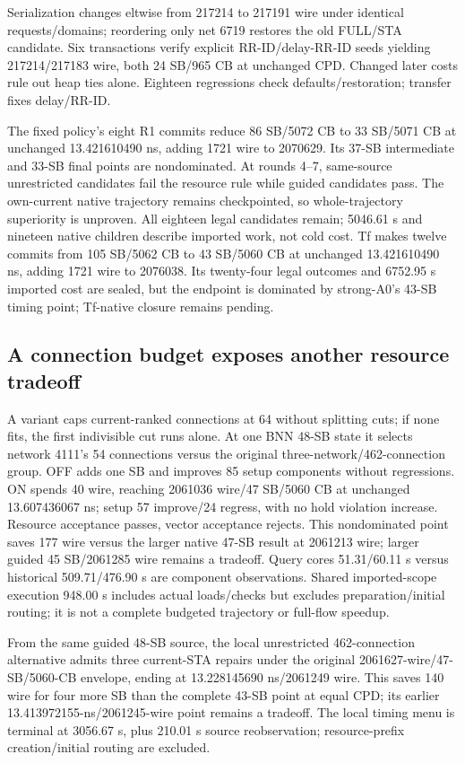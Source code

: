 \documentclass[conference,10pt]{IEEEtran}
\begin{document}
Serialization changes eltwise from 217214 to 217191 wire under identical requests/domains; reordering only net 6719 restores the old FULL/STA candidate. Six transactions verify explicit RR-ID/delay-RR-ID seeds yielding 217214/217183 wire, both 24 SB/965 CB at unchanged CPD. Changed later costs rule out heap ties alone. Eighteen regressions check defaults/restoration; transfer fixes delay/RR-ID.

The fixed policy's eight R1 commits reduce 86 SB/5072 CB to 33 SB/5071 CB at unchanged 13.421610490 ns, adding 1721 wire to 2070629. Its 37-SB intermediate and 33-SB final points are nondominated. At rounds 4--7, same-source unrestricted candidates fail the resource rule while guided candidates pass. The own-current native trajectory remains checkpointed, so whole-trajectory superiority is unproven. All eighteen legal candidates remain; 5046.61 s and nineteen native children describe imported work, not cold cost. Tf makes twelve commits from 105 SB/5062 CB to 43 SB/5060 CB at unchanged 13.421610490 ns, adding 1721 wire to 2076038. Its twenty-four legal outcomes and 6752.95 s imported cost are sealed, but the endpoint is dominated by strong-A0's 43-SB timing point; Tf-native closure remains pending.

\subsection{A connection budget exposes another resource tradeoff}
A variant caps current-ranked connections at 64 without splitting cuts; if none fits, the first indivisible cut runs alone. At one BNN 48-SB state it selects network 4111's 54 connections versus the original three-network/462-connection group. OFF adds one SB and improves 85 setup components without regressions. ON spends 40 wire, reaching 2061036 wire/47 SB/5060 CB at unchanged 13.607436067 ns; setup 57 improve/24 regress, with no hold violation increase. Resource acceptance passes, vector acceptance rejects. This nondominated point saves 177 wire versus the larger native 47-SB result at 2061213 wire; larger guided 45 SB/2061285 wire remains a tradeoff. Query cores 51.31/60.11 s versus historical 509.71/476.90 s are component observations. Shared imported-scope execution 948.00 s includes actual loads/checks but excludes preparation/initial routing; it is not a complete budgeted trajectory or full-flow speedup.

From the same guided 48-SB source, the local unrestricted 462-connection alternative admits three current-STA repairs under the original 2061627-wire/47-SB/5060-CB envelope, ending at 13.228145690 ns/2061249 wire. This saves 140 wire for four more SB than the complete 43-SB point at equal CPD; its earlier 13.413972155-ns/2061245-wire point remains a tradeoff. The local timing menu is terminal at 3056.67 s, plus 210.01 s source reobservation; resource-prefix creation/initial routing are excluded.
\end{document}
